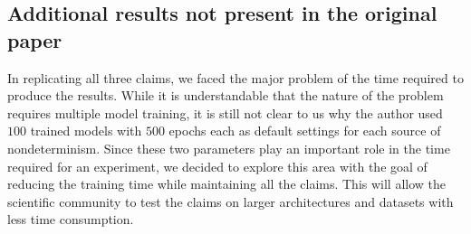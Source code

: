 \begin{table}[!hb]
\centering
{}
	\caption{Reproducibility study for variability reduction. Prominent differences accounted for morethan $10\%$ are shown in red.}
	\label{table:table7}
\end{table}

\subsection{Additional results not present in the original paper}
\label{sec:AdditionalResults}
In replicating all three claims, we faced the major problem of the time required to produce the results. While it is understandable that the nature of the problem requires multiple model training, it is still not clear to us why the author used $100$ trained models with $500$ epochs each as default settings for each source of nondeterminism. Since these two parameters play an important role in the time required for an experiment, we decided to explore this area with the goal of reducing the training time while maintaining all the claims. This will allow the scientific community to test the claims on larger architectures and datasets with less time consumption.

